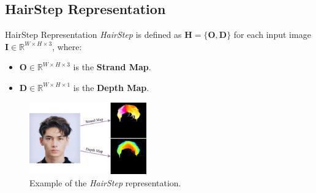 
\subsection{HairStep Representation}

\begin{frame}[t]{HairStep Representation}
    \emph{HairStep} is defined as $\mathbf{H} = \{\mathbf{O}, \mathbf{D}\}$ for each input image $\mathbf{I} \in \mathbb{R}^{W \times H \times 3}$, where:
    \begin{itemize}
        \item $\mathbf{O} \in \mathbb{R}^{W \times H \times 3}$ is the \textbf{Strand Map}.
        \item $\mathbf{D} \in \mathbb{R}^{W \times H \times 1}$ is the \textbf{Depth Map}.
    \end{itemize}

    \vspace{5pt}
    \begin{figure}[t]
        \centering
        \includegraphics[width=0.45\textwidth]{assets/figures/method/hairstep.png}
        \caption{Example of the \emph{HairStep} representation.}
        \label{fig:hairstep_rep}
    \end{figure}
\end{frame}

